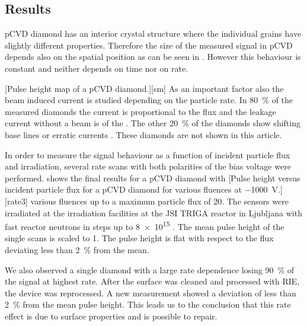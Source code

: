 \subsection{Results}
\ac{pCVD} diamond has an interior crystal structure where the individual grains have slightly different properties. Therefore the size of the measured signal in \ac{pCVD} depends also on the spatial position as can be seen in . However this behaviour is constant and neither depends on time nor on rate.\par
{}[Pulse height map of a \ac{pCVD} diamond.][sm]
As an important factor also the beam induced current is studied depending on the particle rate. In \SI{80}{\%} of the measured diamonds the current is proportional to the flux and the leakage current without a beam is of the . The other \SI{20}{\%} of the diamonds show shifting base lines or erratic currents \cite{erratic}. These diamonds are not shown in this article.\par
In order to measure the signal behaviour as a function of incident particle flux and irradiation, several rate scans with both polarities of the bias voltage were performed.  shows the final results for a \ac{pCVD} diamond with 
[Pulse height versus incident particle flux for a \ac{pCVD} diamond for various fluences at \SI{-1000}{\volt}.][rate3]
various fluences up to a maximum particle flux of \SI{20}{\mhzcm}. The sensors were irradiated at the irradiation facilities at the JSI TRIGA reactor in Ljubljana with fast reactor neutrons in steps up to \SI{8e15}{\ncm} \cite{irrad}. The mean pulse height of the single scans is scaled to 1. The pulse height is flat with respect to the flux deviating less than \SI{2}{\%} from the mean.\par We also observed a single diamond with a large rate dependence losing \SI{90}{\%} of the signal at highest rate. After the surface was cleaned and processed with \ac{RIE}, the device was reprocessed. A new measurement showed a deviation of less than \SI{2}{\%} from the mean pulse height. This leads us to the conclusion that this rate effect is due to surface properties and is possible to repair.
